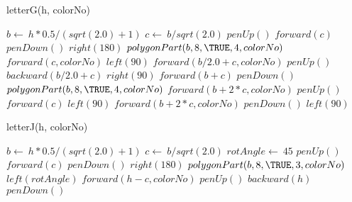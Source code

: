 \documentclass[a4paper,10pt]{article}
\begin{document}
\begin{algorithm}
\caption{letterG(h, colorNo)}
\begin{algorithmic}[5]

\STATE {}
\STATE {}
  \STATE \(b\gets\ h*0.5/(sqrt(2.0)+1)\)
  \STATE \(c\gets\ b/sqrt(2.0)\)
  \STATE \(penUp()\)
  \STATE \(forward(c)\)
  \STATE \(penDown()\)
  \STATE \(right(180)\)
  \STATE {}
  \STATE {}
  \STATE \(polygonPart(b,8,\TRUE,4,colorNo)\)
  \STATE \(forward(c,colorNo)\)
  \STATE \(left(90)\)
  \STATE \(forward(b/2.0+c,colorNo)\)
  \STATE \(penUp()\)
  \STATE \(backward(b/2.0+c)\)
  \STATE \(right(90)\)
  \STATE \(forward(b+c)\)
  \STATE \(penDown()\)
  \STATE {}
  \STATE {}
  \STATE \(polygonPart(b,8,\TRUE,4,colorNo)\)
  \STATE \(forward(b+2*c,colorNo)\)
  \STATE \(penUp()\)
  \STATE \(forward(c)\)
  \STATE \(left(90)\)
  \STATE \(forward(b+2*c,colorNo)\)
  \STATE \(penDown()\)
  \STATE \(left(90)\)

\end{algorithmic}
\end{algorithm}


\begin{algorithm}
\caption{letterJ(h, colorNo)}
\begin{algorithmic}[5]

\STATE {}
\STATE {}
  \STATE \(b\gets\ h*0.5/(sqrt(2.0)+1)\)
  \STATE \(c\gets\ b/sqrt(2.0)\)
  \STATE \(rotAngle\gets\ 45\)
  \STATE \(penUp()\)
  \STATE \(forward(c)\)
  \STATE \(penDown()\)
  \STATE \(right(180)\)
  \STATE {}
  \STATE {}
  \STATE \(polygonPart(b,8,\TRUE,3,colorNo)\)
  \STATE \(left(rotAngle)\)
  \STATE \(forward(h-c,colorNo)\)
  \STATE \(penUp()\)
  \STATE \(backward(h)\)
  \STATE \(penDown()\)

\end{algorithmic}
\end{algorithm}
\end{document}
